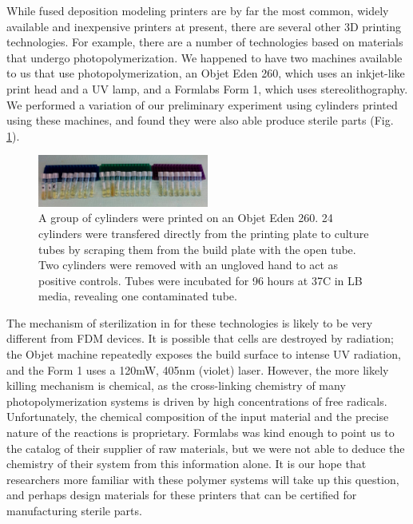\begin{refsection}
While fused deposition modeling printers are by far the most common,
widely available and inexpensive printers at present, there are
several other 3D printing technologies. For example, there are a
number of technologies based on materials that undergo
photopolymerization. We happened to have two machines available to us
that use photopolymerization, an Objet Eden 260, which uses an
inkjet-like print head and a UV lamp, and a Formlabs Form 1, which
uses stereolithography. We performed a variation of our preliminary
experiment using cylinders printed using these machines, and found
they were also able produce sterile parts (Fig. \ref{objet}). 

\begin{figure}
  \centering
    \includegraphics[width=0.5\textwidth]{sterility/figures/Fig10}
 
    \caption{ A group of cylinders were printed on an Objet Eden
      260. 24 cylinders were transfered directly from the printing
      plate to culture tubes by scraping them from the build plate
      with the open tube. Two cylinders were removed with an ungloved
      hand to act as positive controls. Tubes were incubated for 96
      hours at 37C in LB media, revealing one contaminated tube. }
 
    \label{objet}
\end{figure}

The mechanism of sterilization in for these technologies is likely to
be very different from FDM devices. It is possible that cells are
destroyed by radiation; the Objet machine repeatedly exposes the build
surface to intense UV radiation, and the Form 1 uses a 120mW, 405nm
(violet) laser. However, the more likely killing mechanism is
chemical, as the cross-linking chemistry of many photopolymerization
systems is driven by high concentrations of free radicals.
Unfortunately, the chemical composition of the input material and the
precise nature of the reactions is proprietary. Formlabs was kind
enough to point us to the catalog of their supplier of raw materials,
but we were not able to deduce the chemistry of their system from this
information alone. It is our hope that researchers more familiar with
these polymer systems will take up this question, and perhaps design
materials for these printers that can be certified for manufacturing
sterile parts.

\printbibliography[heading=subbibliography]

\end{refsection}